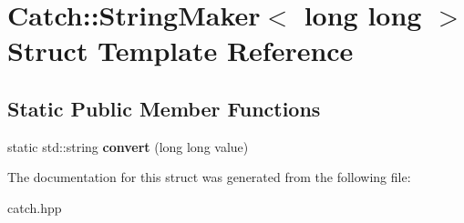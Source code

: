 \hypertarget{structCatch_1_1StringMaker_3_01long_01long_01_4}{}\section{Catch\+:\+:String\+Maker$<$ long long $>$ Struct Template Reference}
\label{structCatch_1_1StringMaker_3_01long_01long_01_4}
\subsection*{Static Public Member Functions}
\begin{DoxyCompactItemize}
\item 
static std\+::string {\bfseries convert} (long long value)\hypertarget{structCatch_1_1StringMaker_3_01long_01long_01_4_a7a58929dca2a14c576d7d6d08bc615d2}{}\label{structCatch_1_1StringMaker_3_01long_01long_01_4_a7a58929dca2a14c576d7d6d08bc615d2}

\end{DoxyCompactItemize}


The documentation for this struct was generated from the following file\+:\begin{DoxyCompactItemize}
\item 
catch.\+hpp\end{DoxyCompactItemize}
